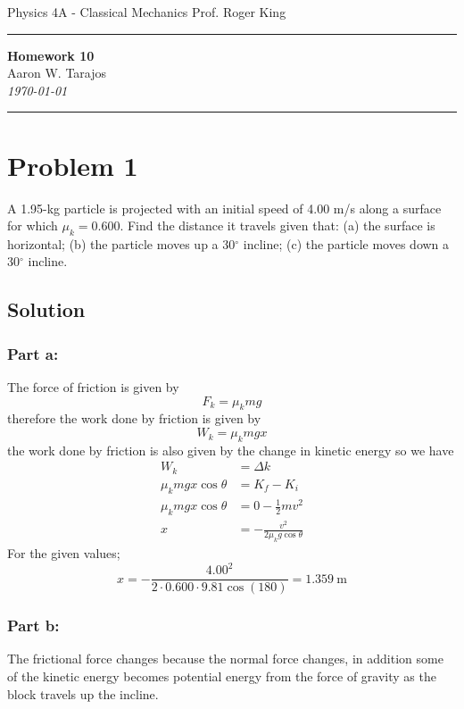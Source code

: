 \documentclass{article}
\begin{document}
\noindent
Physics 4A - Classical Mechanics \hfill Prof. Roger King

\noindent\rule{\textwidth}{0.4pt}

\begin{center}
    \textbf{\LARGE Homework 10} \\
    \vspace{12pt}
    \large Aaron W. Tarajos \\
    \textit{\today}
\end{center}

\noindent\rule{\textwidth}{0.4pt}

\section*{Problem 1}
A 1.95-kg particle is projected with an initial speed of 4.00 m/s along a surface for which $\mu_k = 0.600$.
Find the distance it travels given that: (a) the surface is horizontal; (b) the particle moves up a 30$^\circ$ incline;
(c) the particle moves down a 30$^\circ$ incline.

\subsection*{Solution}
\subsubsection*{Part a:}
The force of friction is given by
\[
	F_k = \mu_k mg
\]
therefore the work done by friction is given by
\[
	W_k = \mu_k mg x
\]
the work done by friction is also given by the change in kinetic energy so we have
\begin{align*}
	W_k &= \Delta k \\
	\mu_k mg x \cos \theta &= K_f - K_i \\
	\mu_k mg x \cos \theta &= 0 - \frac{1}{2}mv^2 \\
	x &= - \frac{v^2}{2 \mu_k g \cos \theta}
\end{align*}
For the given values;
\[
	x = - \frac{4.00^2}{2 \cdot 0.600 \cdot 9.81 \cos(180)} = \boxed{1.359\ \text{m}}
\]

\subsubsection*{Part b:}
The frictional force changes because the normal force changes, in addition some of the kinetic energy becomes potential energy from the force of gravity as the block travels up the incline.
\end{document}
